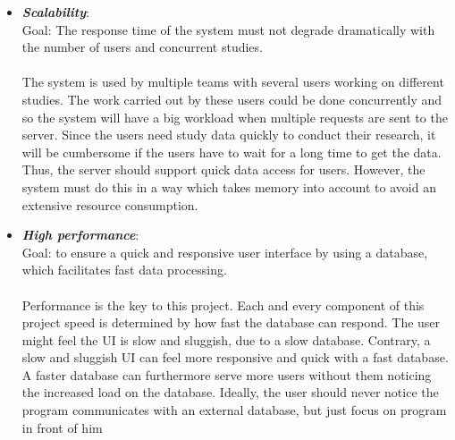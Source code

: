 \begin{itemize}
	\item \textit{\bf{Scalability}}:
	\\
	Goal: The response time of the system must not degrade dramatically with the number of users and concurrent studies. 
	\\\\
	The system is used by multiple teams with several users working on different studies. The work carried out by these users could be done concurrently and so the system will have a big workload when multiple requests are sent to the server. Since the users need study data quickly to conduct their research, it will be cumbersome if the users have to wait for a long time to get the data. Thus, the server should support quick data access for users. However, the system must do this in a way which takes memory into account to avoid an extensive resource consumption.
	
	\item \textit{\bf{High performance}}: 
	\\
	Goal: to ensure a quick and responsive user interface by using a database, which facilitates fast data processing.  
	\\\\
	Performance is the key to this project. Each and every component of this project speed is determined by how fast the database can respond. The user might  feel the UI is slow and sluggish, due to a slow database. Contrary, a slow and sluggish UI can feel more responsive and quick with a fast database. A faster database can furthermore serve more users without them noticing the increased load on the database. Ideally, the user should never notice the program communicates with an external database, but just focus on program in front of him
\end{itemize}